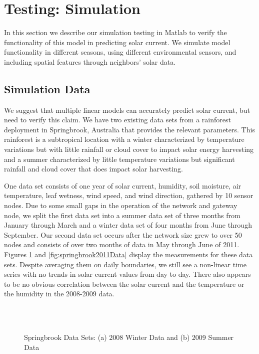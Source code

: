 \documentclass[prodmode,acmtosn]{acmsmall}
\begin{document}
\section{Testing: Simulation} \label{sec:solar-test}
In this section we describe our simulation testing in Matlab to verify the functionality of this model in predicting solar current.
We simulate model functionality in different seasons, using different environmental sensors, and including spatial features through neighbors' solar data.

\subsection{Simulation Data}\label{sec:simulation}
We suggest that multiple linear models can accurately predict solar current, but need to verify this claim.
We have two existing data sets from a rainforest deployment in Springbrook, Australia that provides the relevant parameters.
This rainforest is a subtropical location with a winter characterized by temperature variations but with little rainfall or cloud cover to impact solar energy harvesting and a summer characterized by little temperature variations but significant rainfall and cloud cover that does impact solar harvesting.

One data set consists of one year of solar current, humidity, soil moisture, air temperature, leaf wetness, wind speed, and wind direction, gathered by 10 sensor nodes.
Due to some small gaps in the operation of the network and gateway node, we split the first data set into a summer data set of three months from January through March and a winter data set of four months from June through September.
Our second data set occurs after the network size grew to over 50 nodes and consists of over two months of data in May through June of 2011.
Figures \ref{fig:springbrook2008Data} and \ref{fig:springbrook2011Data} display the measurements for these data sets.
Despite averaging them on daily boundaries, we still see a non-linear time series with no trends in solar current values from day to day.
There also appears to be no obvious correlation between the solar current and the temperature or the humidity in the 2008-2009  data.

\begin{figure}
\centering
  \\
  \\
\caption{Springbrook Data Sets: (a) 2008 Winter Data and (b) 2009 Summer Data}
\label{fig:springbrook2008Data}
\end{figure}
\end{document}
